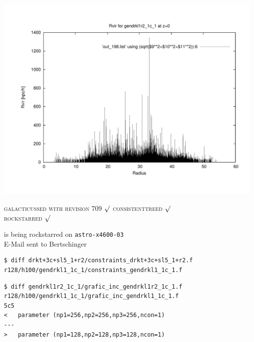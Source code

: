 \includegraphics[scale=0.3]{gendrkl1r2_1c_1/plot_rvir_z0.pdf}

\textsc{galacticussed with revision 709} $\surd$
\textsc{consistenttreed} $\surd$ \\ 
\textsc{rockstarred} $\surd$

is being rockstarred on \texttt{astro-x4600-03} \\

E-Mail sent to Bertschinger \\

\begin{verbatim}
$ diff drkt+3c+sl5_1+r2/constraints_drkt+3c+sl5_1+r2.f 
r128/h100/gendrkl1_1c_1/constraints_gendrkl1_1c_1.f 
\end{verbatim}
\begin{verbatim}
$ diff gendrkl1r2_1c_1/grafic_inc_gendrkl1r2_1c_1.f  
r128/h100/gendrkl1_1c_1/grafic_inc_gendrkl1_1c_1.f 
5c5
< 	parameter (np1=256,np2=256,np3=256,ncon=1)
---
> 	parameter (np1=128,np2=128,np3=128,ncon=1)
\end{verbatim}

